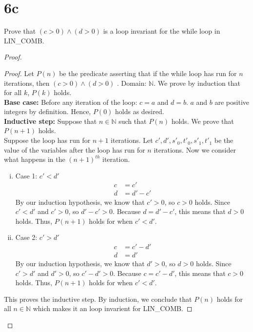 \documentclass[11pt]{scrartcl}
\begin{document}
\section{6c}
Prove that $(c > 0) \land (d > 0)$ is a loop invariant for the while loop in LIN\_COMB.
\begin{proof}
	\begin{proof}
		Let $P(n)$ be the predicate asserting that if the while loop has run for $n$ iterations,
		then $(c > 0) \land (d > 0)$ . 
		Domain: $\mathbb{N}$.
		We prove by induction that for all $k$, $P(k)$ holds.\\
		\textbf{Base case:} Before any iteration of the loop: $c = a$ and $d = b$. 
		$a$ and $b$ are positive integers by definition.
		Hence, $P(0)$ holds as desired.\\
		\textbf{Inductive step:}
		Suppose that $n \in \mathbb{N}$ such that $P(n)$ holds. We prove that $P(n + 1)$ holds.\\
		Suppose the loop has run for $n+ 1$ iterations. Let $c', d', s'_{0}, t'_{0}, s'_{1}, t'_{1}$
		be the value of the variables after the loop has run for $n$ iterations.
		Now we consider what happens in the $(n + 1)^{th}$ iteration.
		\begin{enumerate}[i.]
			\item{
				  Case 1: $c'< d'$
				  \begin{align*}
					  c   & = c' \\
					  d   & = d' - c'            
				  \end{align*}
				  By our induction hypothesis, we know that $c' > 0$, so $c > 0$ holds.
				  Since $c' < d'$ and $c' > 0$, so $d' - c' > 0$. Because $d = d' - c'$, this means that $d >0$ holds.
				  Thus, $P(n+1)$ holds for when $c'<d'$.
				  }
			\item{
				  Case 2: $c'>d'$
				  \begin{align*}
					  c   & = c' - d'       \\
					  d   & = d'            
				  \end{align*}
				  By our induction hypothesis, we know that $d' > 0$, so $d > 0$ holds.
				  Since $c' > d'$ and $d' > 0$, so $c' - d' > 0$. Because $c = c' - d'$, this means that $c >0$ holds.
				  Thus, $P(n+1)$ holds for when $c'<d'$.
				  }
		\end{enumerate}
		This proves the inductive step.  By induction,  we conclude that $P(n)$ holds for all $n \in \mathbb{N}$ 
		which makes it an loop invarient for LIN\_COMB.
	
	\end{proof}
\end{proof}
\end{document}
